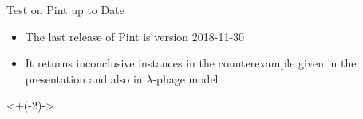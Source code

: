 \begin{frame}[noframenumbering]{Test on Pint up to Date}
    \begin{itemize}[<+(-1)->]
        \item The last release of Pint is version 2018-11-30
        \item It returns inconclusive instances in the counterexample given in the presentation and also in $\lambda$-phage model
    \end{itemize}
    
    \vspace{0.5cm}
    
    
	\onslide<+(-2)->{
    \vspace{0.5cm}
    }
\end{frame}